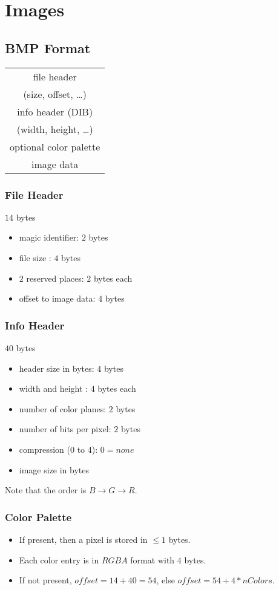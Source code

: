 \section{Images}
\subsection{BMP Format}
\begin{tabular}{|c|}
  \hline
  file header\\
  (size, offset, \dots)\\
  \hline
  info header (DIB)\\
  (width, height, \dots)\\
  \hline
  optional color palette\\
  \hline
  image data\\
  \hline
\end{tabular}
\subsubsection{File Header}
$14$ bytes
\begin{itemize}
  \item magic identifier: $2$ bytes
  \item file size : $4$ bytes
  \item $2$ reserved places: $2$ bytes each
  \item offset to image data: $4$ bytes
\end{itemize}
\subsubsection{Info Header}
$40$ bytes
\begin{itemize}
  \item header size in bytes: $4$ bytes
  \item width and height : $4$ bytes each
  \item number of color planes: $2$ bytes
  \item number of bits per pixel: $2$ bytes
  \item compression (0 to 4): $0 = none$
  \item image size in bytes
\end{itemize}
{\color{red} Note that the order is $B \rightarrow G \rightarrow R$.}
\subsubsection{Color Palette}
\begin{itemize}
  \item If present, then a pixel is stored in $\leq 1$ bytes.
  \item Each color entry is in $RGBA$ format with $4$ bytes.
  \item If not present, $offset = 14+40 =54$, else $offset=54+4*nColors$.
\end{itemize}
